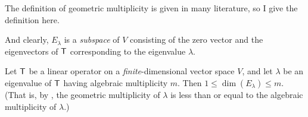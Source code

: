 \begin{note}
The definition of geometric multiplicity is given in many literature, so I give the definition here.

And clearly, \(E_{\lambda}\) is a \emph{subspace} of \(V\) consisting of the zero vector and the eigenvectors of \(\textsf{T}\) corresponding to the eigenvalue \(\lambda\).
\end{note}

\begin{theorem} \label{thm 5.7}
Let \(\textsf{T}\) be a linear operator on a \emph{finite}-dimensional vector space \(V\), and let \(\lambda\) be an eigenvalue of \(\textsf{T}\) having algebraic multiplicity \(m\).
Then \(1 \le \dim(E_{\lambda}) \le m\).
(That is, by , the geometric multiplicity of \(\lambda\) is less than or equal to the algebraic multiplicity of \(\lambda\).)
\end{theorem}

